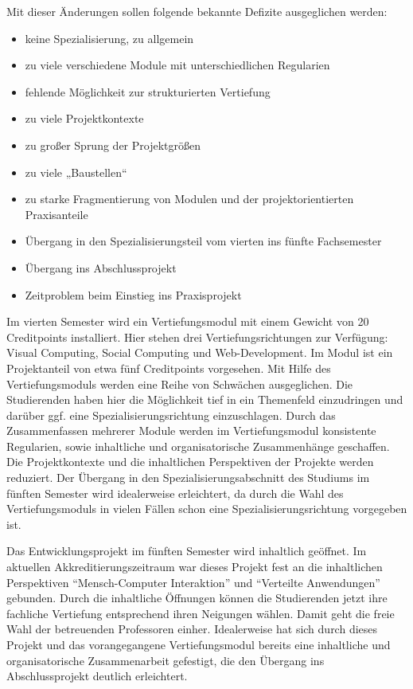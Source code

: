 Mit dieser Änderungen sollen folgende bekannte Defizite ausgeglichen
werden:

\begin{itemize}
\tightlist
\item
  keine Spezialisierung, zu allgemein
\item
  zu viele verschiedene Module mit unterschiedlichen Regularien
\item
  fehlende Möglichkeit zur strukturierten Vertiefung
\item
  zu viele Projektkontexte
\item
  zu großer Sprung der Projektgrößen
\item
  zu viele „Baustellen``
\item
  zu starke Fragmentierung von Modulen und der projektorientierten
  Praxisanteile
\item
  Übergang in den Spezialisierungsteil vom vierten ins fünfte
  Fachsemester
\item
  Übergang ins Abschlussprojekt
\item
  Zeitproblem beim Einstieg ins Praxisprojekt
\end{itemize}

Im vierten Semester wird ein Vertiefungsmodul mit einem Gewicht von 20
Creditpoints installiert. Hier stehen drei Vertiefungsrichtungen zur
Verfügung: Visual Computing, Social Computing und Web-Development. Im
Modul ist ein Projektanteil von etwa fünf Creditpoints vorgesehen. Mit
Hilfe des Vertiefungsmoduls werden eine Reihe von Schwächen
ausgeglichen. Die Studierenden haben hier die Möglichkeit tief in ein
Themenfeld einzudringen und darüber ggf. eine Spezialisierungsrichtung
einzuschlagen. Durch das Zusammenfassen mehrerer Module werden im
Vertiefungsmodul konsistente Regularien, sowie inhaltliche und
organisatorische Zusammenhänge geschaffen. Die Projektkontexte und die
inhaltlichen Perspektiven der Projekte werden reduziert. Der Übergang in
den Spezialisierungsabschnitt des Studiums im fünften Semester wird
idealerweise erleichtert, da durch die Wahl des Vertiefungsmoduls in
vielen Fällen schon eine Spezialisierungsrichtung vorgegeben ist.

Das Entwicklungsprojekt im fünften Semester wird inhaltlich geöffnet. Im
aktuellen Akkreditierungszeitraum war dieses Projekt fest an die
inhaltlichen Perspektiven ``Mensch-Computer Interaktion'' und
``Verteilte Anwendungen'' gebunden. Durch die inhaltliche Öffnungen
können die Studierenden jetzt ihre fachliche Vertiefung entsprechend
ihren Neigungen wählen. Damit geht die freie Wahl der betreuenden
Professoren einher. Idealerweise hat sich durch dieses Projekt und das
vorangegangene Vertiefungsmodul bereits eine inhaltliche und
organisatorische Zusammenarbeit gefestigt, die den Übergang ins
Abschlussprojekt deutlich erleichtert.


